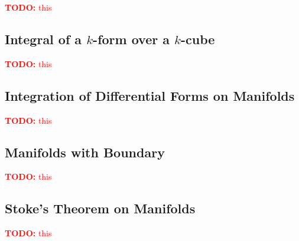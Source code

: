 \documentclass{article}
\newcommand{\TODO}[1]{\textcolor{red}{\textbf{TODO:} #1}}
\begin{document}
\TODO{this}

\subsection{Integral of a \(k\)-form over a \(k\)-cube}

\TODO{this}

\subsection{Integration of Differential Forms on Manifolds}

\TODO{this}

\subsection{Manifolds with Boundary}

\TODO{this}

\subsection{Stoke's Theorem on Manifolds}

\TODO{this}
\end{document}
